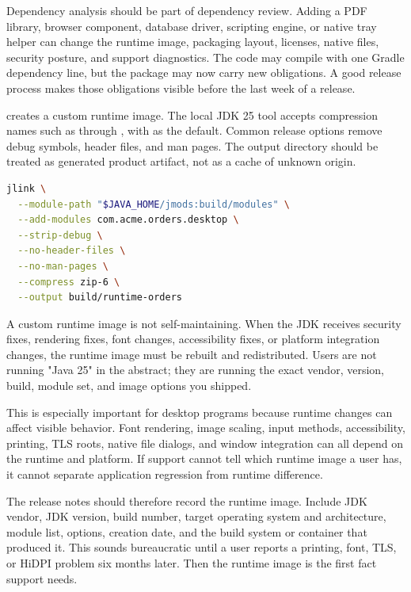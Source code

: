 Dependency analysis should be part of dependency review. Adding a PDF library, browser component, database driver, scripting engine, or native tray helper can change the runtime image, packaging layout, licenses, native files, security posture, and support diagnostics. The code may compile with one Gradle dependency line, but the package may now carry new obligations. A good release process makes those obligations visible before the last week of a release.

 creates a custom runtime image. The local JDK 25 tool accepts compression names such as  through , with  as the default. Common release options remove debug symbols, header files, and man pages. The output directory should be treated as generated product artifact, not as a cache of unknown origin.

\begin{lstlisting}[language=sh,caption={Creating a JDK 25 runtime image for a modular Swing app.}]
jlink \
  --module-path "$JAVA_HOME/jmods:build/modules" \
  --add-modules com.acme.orders.desktop \
  --strip-debug \
  --no-header-files \
  --no-man-pages \
  --compress zip-6 \
  --output build/runtime-orders
\end{lstlisting}

A custom runtime image is not self-maintaining. When the JDK receives security fixes, rendering fixes, font changes, accessibility fixes, or platform integration changes, the runtime image must be rebuilt and redistributed. Users are not running "Java 25" in the abstract; they are running the exact vendor, version, build, module set, and image options you shipped.

This is especially important for desktop programs because runtime changes can affect visible behavior. Font rendering, image scaling, input methods, accessibility, printing, TLS roots, native file dialogs, and window integration can all depend on the runtime and platform. If support cannot tell which runtime image a user has, it cannot separate application regression from runtime difference.

The release notes should therefore record the runtime image. Include JDK vendor, JDK version, build number, target operating system and architecture, module list,  options, creation date, and the build system or container that produced it. This sounds bureaucratic until a user reports a printing, font, TLS, or HiDPI problem six months later. Then the runtime image is the first fact support needs.

